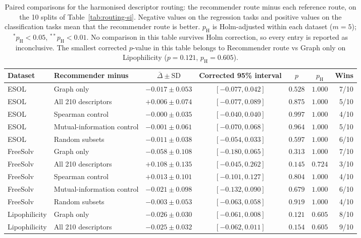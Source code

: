 \begin{table}[H]
\caption{Paired comparisons for the harmonised descriptor routing: the recommender route minus each reference route, on the 10 splits of Table~\ref{tab:routing-si}. Negative values on the regression tasks and positive values on the classification tasks mean that the recommender route is better. $p_{\mathrm{H}}$ is Holm-adjusted within each dataset ($m=5$); $^{*}p_{\mathrm{H}}<0.05$, $^{**}p_{\mathrm{H}}<0.01$. No comparison in this table survives Holm correction, so every entry is reported as inconclusive. The smallest corrected $p$-value in this table belongs to Recommender route vs Graph only on Lipophilicity ($p=0.121$, $p_{\mathrm{H}}=0.605$).}\label{tab:routing-stats}
\centering\scriptsize
\setlength{\tabcolsep}{4pt}
\begin{tabular}{@{}llccccr@{}}
\toprule
Dataset & Recommender minus & $\bar\Delta\pm\mathrm{SD}$ & Corrected 95\% interval & $p$ & $p_{\mathrm{H}}$ & Wins \\
\midrule
ESOL & Graph only & $-0.017\pm0.053$ & $[-0.077,0.042]$ & $0.528$ & $1.000$ & 7/10 \\
ESOL & All 210 descriptors & $+0.006\pm0.074$ & $[-0.077,0.089]$ & $0.875$ & $1.000$ & 5/10 \\
ESOL & Spearman control & $-0.000\pm0.035$ & $[-0.040,0.040]$ & $0.997$ & $1.000$ & 4/10 \\
ESOL & Mutual-information control & $-0.001\pm0.061$ & $[-0.070,0.068]$ & $0.964$ & $1.000$ & 5/10 \\
ESOL & Random subsets & $-0.011\pm0.038$ & $[-0.054,0.033]$ & $0.597$ & $1.000$ & 6/10 \\
\midrule
FreeSolv & Graph only & $-0.058\pm0.108$ & $[-0.180,0.065]$ & $0.313$ & $1.000$ & 7/10 \\
FreeSolv & All 210 descriptors & $+0.108\pm0.135$ & $[-0.045,0.262]$ & $0.145$ & $0.724$ & 3/10 \\
FreeSolv & Spearman control & $+0.013\pm0.101$ & $[-0.101,0.127]$ & $0.804$ & $1.000$ & 4/10 \\
FreeSolv & Mutual-information control & $-0.021\pm0.098$ & $[-0.132,0.090]$ & $0.679$ & $1.000$ & 6/10 \\
FreeSolv & Random subsets & $-0.003\pm0.053$ & $[-0.063,0.058]$ & $0.919$ & $1.000$ & 4/10 \\
\midrule
Lipophilicity & Graph only & $-0.026\pm0.030$ & $[-0.061,0.008]$ & $0.121$ & $0.605$ & 8/10 \\
Lipophilicity & All 210 descriptors & $-0.025\pm0.032$ & $[-0.062,0.011]$ & $0.154$ & $0.605$ & 9/10 \\

\end{tabular}
\end{table}
